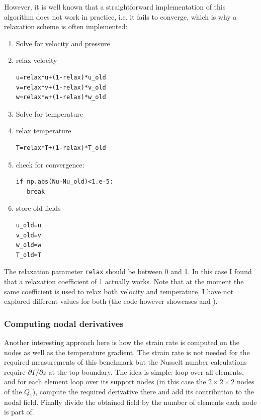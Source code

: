 However, it is well known that a straightforward implementation of this algorithm does not 
work in practice, i.e. it fails to converge, which is why a relaxation scheme is often implemented:
\begin{enumerate}
\item Solve for velocity and pressure
\item relax velocity
\begin{lstlisting}
u=relax*u+(1-relax)*u_old
v=relax*v+(1-relax)*v_old
w=relax*w+(1-relax)*w_old
\end{lstlisting}
\item Solve for temperature
\item relax temperature
\begin{lstlisting}
T=relax*T+(1-relax)*T_old
\end{lstlisting}
\item check for convergence:
\begin{lstlisting}
if np.abs(Nu-Nu_old)<1.e-5:
   break
\end{lstlisting}
\item store old fields
\begin{lstlisting}
u_old=u
v_old=v
w_old=w
T_old=T
\end{lstlisting}
\end{enumerate}
The relaxation parameter \lstinline{relax} should be between 0 and 1.
In this case I found that a relaxation coefficient of 1 actually works.
Note that at the moment the same coefficient is used to relax both velocity and temperature, I have 
not explored different values for both (the code however showcases 
and ).

\subsubsection*{Computing nodal derivatives}  

Another interesting approach here is how the strain rate is computed on the nodes as well as
the temperature gradient. The strain rate is not needed for the required measurements of this 
benchmark but the Nusselt number calculations require $\partial T/\partial z$ at the top
boundary.    
The idea is simple: loop over all elements, and for each element loop over its support nodes
(in this case the $2\times 2\times 2$ nodes of the $Q_1$), compute the required derivative 
there and add its contribution to the nodal field. Finally divide the obtained field by 
the number of elements each node is part of.

